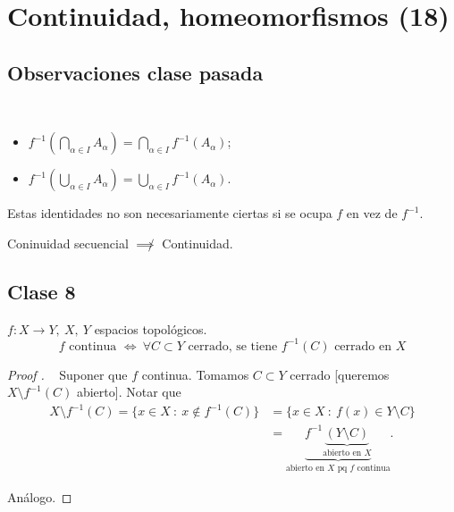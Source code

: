 \section{Continuidad, homeomorfismos (18)}

\subsection{Observaciones clase pasada}

\begin{remark}~
	\begin{itemize}
		\item $f^{-1}\left( \displaystyle\bigcap_{\alpha\in I} A_{\alpha} \right) = \displaystyle\bigcap_{\alpha\in I} f^{-1}(A_{\alpha})$;

		\item $f^{-1}\left( \displaystyle\bigcup_{\alpha \in I} A_{\alpha} \right) = \displaystyle\bigcup_{\alpha \in I} f^{-1}(A_{\alpha})$.
	\end{itemize}
	\noindent Estas identidades no son necesariamente ciertas si se ocupa $f$ en vez de $f^{-1}$.
\end{remark}

\begin{remark}[Tarea 2]
	Coninuidad secuencial $\not\implies$ Continuidad.
\end{remark}

\subsection{Clase 8}

\begin{lemma}
	$f:X\to Y,\ X,\ Y$ espacios topológicos.
	\[ f \text{ continua } \iff \ \forall C \subset Y \text{ cerrado, se tiene } f^{-1}(C) \text{ cerrado en } X \]
\end{lemma}
\begin{proof}[Proof ]~
	\Onlyifstep Suponer que $f$ continua. Tomamos $C \subset Y$ cerrado [queremos $X\setminus f^{-1}(C)$ abierto]. Notar que
	\begin{align*}
		X\setminus f^{-1}(C) = \{ x \in X \ : \ x \not\in f^{-1}(C) \} & = \{ x \in X \ : \ f(x) \in Y\setminus C \} \\
		& = \underbrace{f^{-1}\underbrace{(Y\setminus C)}_{\text{abierto en } X}}_{\text{abierto en } X \text{ pq } f \text{ continua}}
	.\end{align*}
	
	\noindent \Ifstep Análogo.
\end{proof}

